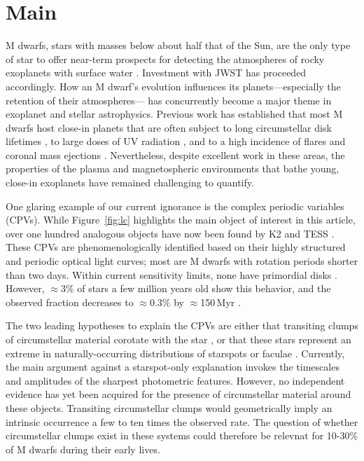 \documentclass{nature3}
\begin{document}

\section{Main}
\label{sec:main}

M dwarfs, stars with masses below about half that of the Sun, are the
only type of star to offer near-term prospects for detecting the
atmospheres of rocky exoplanets with surface water
\cite{NAP26141}.  Investment with JWST has proceeded accordingly.  How
an M dwarf's evolution influences its planets---especially the
retention of their atmospheres--- has concurrently become a major
theme in exoplanet and stellar astrophysics.  Previous work has
established that most M dwarfs host close-in planets
\cite{Dressing2015} that are often subject to long
circumstellar disk lifetimes \cite{Ribas2015}, to large doses of UV
radiation \cite{France2013}, and to a high incidence of flares and
coronal mass ejections \cite{Gunther2020}.  Nevertheless, despite excellent
work in these areas, the properties of the plasma and magnetospheric
environments that bathe young, close-in exoplanets have remained
challenging to quantify.

One glaring example of our current ignorance is the complex periodic
variables (CPVs).  While Figure~\ref{fig:lc} highlights the main object of
interest in this article, over one hundred analogous objects have
now been found by K2 and TESS 
\cite{Rebull2016,Stauffer2017,Rebull2018,Zhan2019,Rebull2020,Bouma2024}.
These CPVs are
phenomenologically identified based on their highly structured and
periodic optical light curves;
most are M dwarfs with rotation periods shorter than two days.
Within current sensitivity limits, none have primordial disks
\cite{Stauffer2017,Bouma2024}.
However, $\approx$3\% of stars a few million years old show this
behavior, and the observed fraction decreases to $\approx$0.3\%
by $\approx$150\,Myr \cite{Rebull2020}.

The two leading hypotheses to explain the CPVs are either that
transiting clumps of circumstellar material corotate with the star
\cite{Stauffer2017,Gunther2022,Bouma2024}, or that these stars
represent an extreme in naturally-occurring distributions of starspots
or faculae \cite{Koen2021}.  Currently, the main argument against a
starspot-only explanation invokes the timescales and amplitudes of the
sharpest photometric features.  However, no independent evidence has
yet been acquired for the presence of circumstellar material around these
objects.  
Transiting circumstellar clumps would geometrically imply an intrinsic
occurrence a few to ten times the observed rate.  The question of
whether circumstellar clumps exist in these systems could therefore be
relevnat for 10-30\% of M dwarfs during their early lives.
\end{document}
